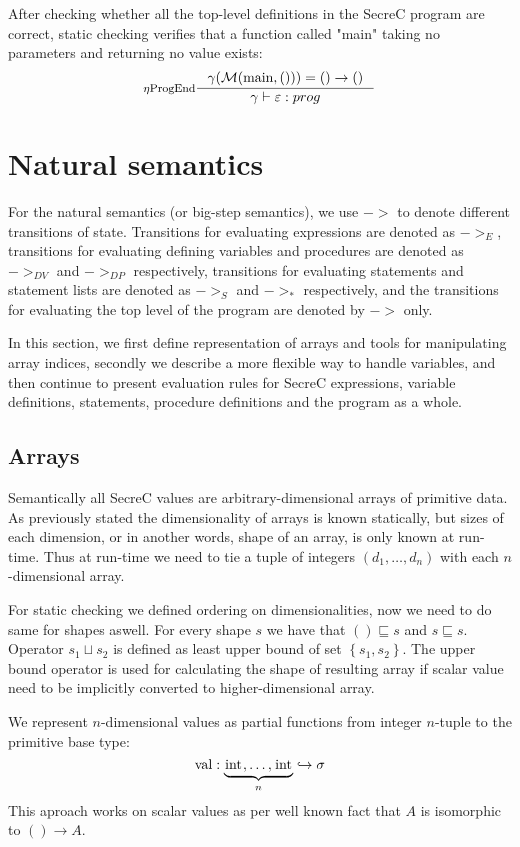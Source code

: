 \documentclass[a4paper, 10pt, draft]{report}
\newcommand{\mycode}[1]{\ensuremath{\mbox{\lstinline{#1}}}}
\begin{document}
After checking whether all the top-level definitions in the SecreC program are
correct, static checking verifies that a function called "main" taking no
parameters and returning no value exists:
\[ \inference[$\eta$ProgEnd]{
  \gamma(\mathcal{M}(\mycode{main}, ())) = ()\to()
}{
  \gamma |- \varepsilon : prog
} \]

\chapter{Natural semantics}\label{sec:semantics}

For the natural semantics (or big-step semantics), we use $->$ to denote
different transitions of state. Transitions for evaluating expressions are
denoted as $->_E$, transitions for evaluating defining variables and procedures
are denoted as $->_{DV}$ and $->_{DP}$ respectively, transitions for evaluating
statements and statement lists are denoted as $->_S$ and $->_{*}$ respectively,
and the transitions for evaluating the top level of the program are denoted by
$->$ only.

In this section, we first define representation of arrays and tools for
manipulating array indices, secondly we describe a more flexible way to handle
variables, and then continue to present evaluation rules for SecreC
expressions, variable definitions, statements, procedure definitions and the
program as a whole.

\section{Arrays}\label{sec:semantics:arrays}

Semantically all SecreC values are arbitrary-dimensional arrays of primitive
data.  As previously stated the dimensionality of arrays is known statically,
but sizes of each dimension, or in another words, shape of an array, is only
known at run-time. Thus at run-time we need to tie a tuple of integers $(d_1,
\ldots, d_n)$ with each $n$-dimensional array.

For static checking we defined ordering on dimensionalities, now we need to do
same for shapes aswell. For every shape $s$ we have that $() \sqsubseteq s$ and
$s \sqsubseteq s$. Operator $s_1 \sqcup s_2$ is defined as least upper bound of
set $\left\{ s_1, s_2 \right\}$. The upper bound operator is used for
calculating the shape of resulting array if scalar value need to be implicitly
converted to higher-dimensional array.

We represent $n$-dimensional values as partial functions from integer $n$-tuple
to the primitive base type:
\[
  \operatorname{val} : \underbrace{\mycode{int},\ldots,\mycode{int}}_{n} \hookrightarrow \sigma
\]
This aproach works on scalar values as per well known fact that $A$ is isomorphic to $() \to A$.
\end{document}
